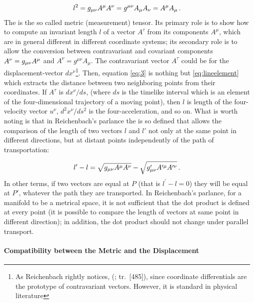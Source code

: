 \documentclass[submitted]{article}
\newcommand{\labtag}[1]{\label{#1}}
\newcommand{\til}{timelike\xspace}
\renewcommand{\rzlap}[2]{(\cite[#1]{Reichenbach1928}; tr.\ [#2])\xspace}
\begin{document}
 
\begin{equation}\labtag{eq:3}
l^2=\gmn A^\mu A^\nu = g^{\mu\nu} A_\mu A_\nu = A^\mu A_\mu\,.
\end{equation}
%
The \gmn is the so called metric (\ie measurement) tensor. Its primary role is to show how to compute an invariant length $l$ of a vector $A^\tau$ from its components $A^\mu$, which are in general different in different coordinate systems; its secondary role is to allow the conversion between contravariant and covariant components $A^\nu = g_{\mu\nu} A^\mu$ and $A^\nu = g^{\mu \nu} A_\mu$. The contravariant vector $A^\tau$ could be for the displacement-vector $dx^\nu$\footnote{As Reichenbach rightly notices,  \rzlap{348}{485\fn}, since coordinate differentials are the prototype of contravariant vectors. However, it is standard in physical literature}. Then, equation \cref{eq:3} is nothing but \cref{eq:lineelement} which extracts the distance between two neighboring points from their coordinates. If $A^\tau$ is $dx^\nu/ds$, (where $ds$ is the \til interval which is an element of the four-dimensional trajectory of a moving point), then $l$ is length of the four-velocity vector $u^\nu$, $d^{2} x^{\nu} / d s^{2}$ is the four-acceleration, and so on. What is  worth noting is that in Reichenbach's parlance the  \gmn is so defined that allows the comparison of the length of two vectors $l$ and $l'$ not only at the same point in different directions, but at distant points independently of the path of transportation:

\begin{equation*}
l^{\prime}-l=\sqrt{g_{\mu\nu} A^\mu A^\nu}-\sqrt{g_{\mu\nu}^{\prime} A^{\prime\mu} A^{\prime\nu}}\,.
\end{equation*}
%
In other terms, if two vectors are equal at $P$ (that is $l^{\prime}-l=0$) they will be equal at $P'$, whatever the path they are transported. In Reichenbach's parlance, for a manifold to be a metrical space, it is not sufficient that the dot product is defined at every point (\ie it is possible to compare the length of vectors at same point in different direction); in addition, the dot product should not change under parallel transport.

\paragraph{Compatibility between the Metric and the Displacement}
\end{document}
